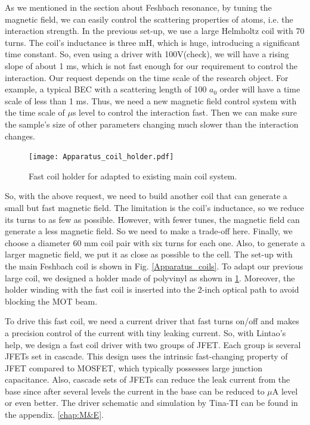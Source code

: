 As we mentioned in the section about Feshbach resonance, by tuning the magnetic field, we can easily control the scattering properties of atoms, i.e. the interaction strength. In the previous set-up, we use a large Helmholtz coil with 70 turns. The coil's inductance is three mH, which is huge, introducing a significant time constant. So, even using a driver with 100V(check), we will have a rising slope of about 1 ms, which is not fast enough for our requirement to control the interaction. Our request depends on the time scale of the research object. For example, a typical BEC with a scattering length of 100 $a_0$ order will have a time scale of less than 1 ms. Thus, we need a new magnetic field control system with the time scale of $\mu$s level to control the interaction fast. Then we can make sure the sample's size of other parameters changing much slower than the interaction changes.

\begin{figure}[htb]
\begin{center}
\texttt{[image: Apparatus\_coil\_holder.pdf]}
\end{center}
\caption[Fast coil holder]{Fast coil holder for adapted to existing main coil system.}
\label{Apparatus_coil_holder}
\end{figure}

So, with the above request, we need to build another coil that can generate a small but fast magnetic field. The limitation is the coil's inductance, so we reduce its turns to as few as possible. However, with fewer tunes, the magnetic field can generate a less magnetic field. So we need to make a trade-off here. Finally, we choose a diameter 60 mm coil pair with six turns for each one. Also, to generate a larger magnetic field, we put it as close as possible to the cell. The set-up with the main Feshbach coil is shown in Fig. \ref{Apparatus_coils}. To adapt our previous large coil, we designed a holder made of polyvinyl as shown in \ref{Apparatus_coil_holder}. Moreover, the holder winding with the fast coil is inserted into the 2-inch optical path to avoid blocking the MOT beam.

To drive this fast coil, we need a current driver that fast turns on/off and makes a precision control of the current with tiny leaking current. So, with Lintao's help, we design a fast coil driver with two groups of JFET. Each group is several JFETs set in cascade. This design uses the intrinsic fast-changing property of JFET compared to MOSFET, which typically possesses large junction capacitance. Also, cascade sets of JFETs can reduce the leak current from the base since after several levels the current in the base can be reduced to $\mu$A level or even better. The driver schematic and simulation by Tina-TI can be found in the appendix. \ref{chap:M&E}.

